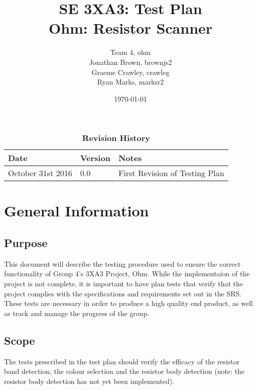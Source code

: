 \documentclass[12pt, titlepage]{article}
\title{SE 3XA3: Test Plan\\ Ohm: Resistor Scanner}
\author{Team 4, ohm
		\\ Jonathan Brown, brownjs2
		\\ Graeme Crawley, crawleg
		\\ Ryan Marks, marksr2
}
\date{\today}
\begin{document}
\maketitle
{}
\tableofcontents
\newpage
\listoftables
\begin{table}[h]
\caption{\bf Revision History}
\begin{tabularx}{\textwidth}{p{3cm}p{2cm}X}
\toprule {\bf Date} & {\bf Version} & {\bf Notes}\\
\midrule
October 31st 2016 & 0.0 & First Revision of Testing Plan\\
\bottomrule
\end{tabularx}
\end{table}
\newpage
{}
\section{General Information}
\subsection{Purpose}
\par This document will describe the testing procedure used to ensure the correct functionality of Group 4's 3XA3 Project, Ohm. While the implementaion of the project is not complete, it is important to have plan tests that verify that the project complies with the specifications and requirements set out in the SRS. These tests are necessary in order to produce a high quality end product, as well as track and manage the progress of the group.
\subsection{Scope}
\par The tests prescribed in the test plan should verify the efficacy of the resistor band detection, the colour selection and the resistor body detection (note: the resistor body detection has not yet been implemented).
\end{document}
